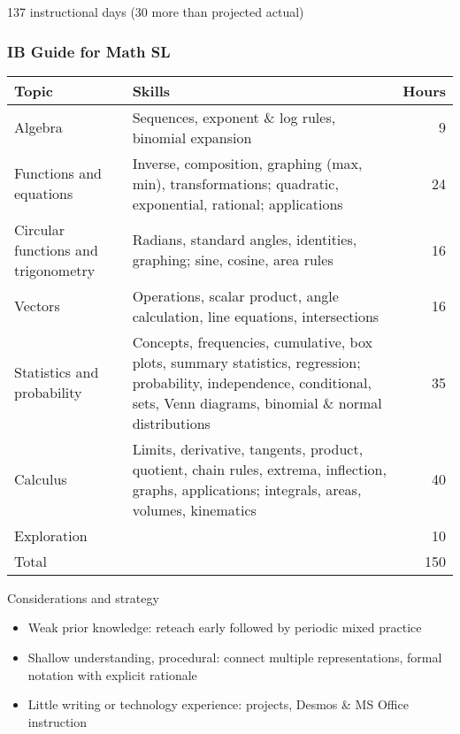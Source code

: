 \documentclass[12pt, twoside]{article}
\begin{document}
137 instructional days (30 more than projected actual)


\newpage
\subsubsection*{IB Guide for Math SL}

\begin{tabular}{|p{6cm}|p{12cm}|r|}
  \hline
  Topic & Skills & Hours \\
  \hline
  Algebra &Sequences, exponent \& log rules, binomial expansion& 9 \\
  \hline
  Functions and equations &Inverse, composition, graphing (max, min), transformations; quadratic, exponential, rational; applications & 24 \\
  \hline
  Circular functions and trigonometry & Radians, standard angles, identities, graphing; sine, cosine, area rules & 16 \\
  \hline
  Vectors & Operations, scalar product, angle calculation, line equations, intersections & 16 \\
  \hline
  Statistics and probability &Concepts, frequencies, cumulative, box plots, summary statistics, regression; probability, independence, conditional, sets, Venn diagrams, binomial \& normal distributions & 35 \\
  \hline
  Calculus &Limits, derivative, tangents, product, quotient, chain rules, extrema, inflection, graphs, applications; integrals, areas, volumes, kinematics& 40 \\
  \hline
  Exploration && 10 \\
  \hline
  Total && 150 \\
  \hline
\end{tabular}

  \vspace{1cm}

Considerations and strategy
\begin{itemize}
  \item Weak prior knowledge: reteach early followed by periodic mixed practice
  \item Shallow understanding, procedural: connect multiple representations, formal notation with explicit rationale
  \item Little writing or technology experience: projects, Desmos \& MS Office instruction
\end{itemize}
\end{document}
